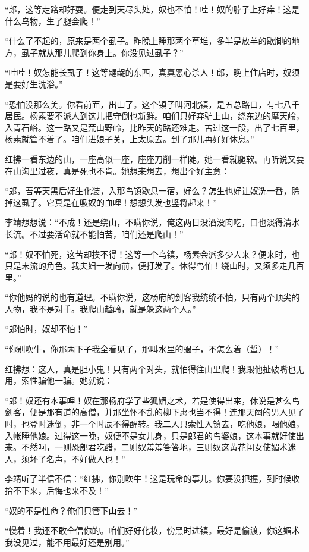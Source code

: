 “郎，这等走路却好耍。便走到天尽头处，奴也不怕！哇！奴的脖子上好痒！这是什么鸟物，生了腿会爬！”

“什么了不起的，原来是两个虱子。昨晚上睡那两个草堆，多半是放羊的歇脚的地方，虱子就从那儿爬到你身上。你没见过虱子？”

“哇哇！奴怎能长虱子！这等龌龊的东西，真真恶心杀人！郎，晚上住店时，奴须是要好生洗浴。”

“恐怕没那么美。你看前面，出山了。这个镇子叫河北镇，是五总路口，有七八千居民。杨素要不派人到这儿把守倒也新鲜。咱们只好弃驴上山，绕东边的摩天岭，入青石峪。这一路又是荒山野岭，比昨天的路还难走。苦过这一段，出了七百里，杨素就管不着了。咱们进娘子关，上太原去。到了那儿再好好休息。”

红拂一看东边的山，一座高似一座，座座刀削一样陡。她一看就腿软。再听说又要在山沟里过夜，真是死也不肯。她想来想去，想出个好主意：

“郎，吾等天黑后好生化装，入那鸟镇歇息一宿，好么？怎生也好让奴洗一番，除掉这虱子。它真是在吸奴的血哩！想想头发也竖将起来！”

李靖想想说：“不成！还是绕山，不瞒你说，俺这两日没酒没肉吃，口也淡得清水长流。不过要活命就不能怕苦，咱们还是爬山！”

“郎！奴不怕死，这苦却挨不得！这等一个鸟镇，杨素会派多少人来？便来时，也只是末流的角色。我夫妇一发向前，便打发了。休得鸟怕！绕山时，又须多走几百里。”

“你他妈的说的也有道理。不瞒你说，这杨府的剑客我统统不怕，只有两个顶尖的人物，我不是对手。我爬山越岭，就是躲这两个人。”

“郎怕时，奴却不怕！”

“你别吹牛，你那两下子我全看见了，那叫水里的蝎子，不怎么着（蜇）！”

红拂想：这人，真是胆小鬼！只有两个对头，就怕得往山里爬！我跟他扯破嘴也无用，索性骗他一骗。她就说：

“郎！奴还有本事哩！奴在那杨府学了些狐媚之术，若是使得出来，休说是甚么鸟剑客，便是那有道的高僧，并那坐怀不乱的柳下惠也当不得！连那天阉的男人见了时，也登时迷倒，非一个时辰不得醒转。我二人只索性入镇去，吃他娘，喝他娘，入帐睡他娘。过得这一晚，奴便不是女儿身，只是郎君的鸟婆娘，这本事就好使出来。不然呵，一则恐郎君吃醋，二则奴羞羞答答地，三则奴这黄花闺女使媚术迷人，须坏了名声，不好做人也！”

李靖听了半信不信：“红拂，你别吹牛！这是玩命的事儿。你要没把握，到时候收拾不下来，后悔也来不及！”

“奴的不是性命？俺们只管下山去！”

“慢着！我还不敢全信你的。咱们好好化妆，傍黑时进镇。最好是偷渡，你这媚术我没见过，能不用最好还是别用。”

